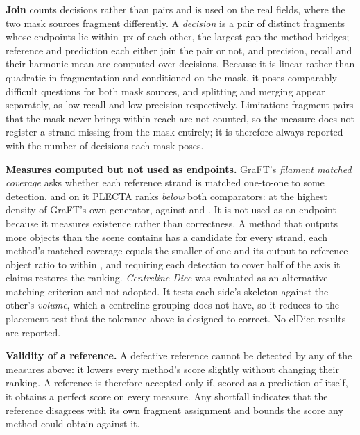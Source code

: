 \textbf{Join \Fone{}} counts decisions rather than pairs and is used on the
real fields, where the two mask sources fragment differently. A
\emph{decision} is a pair of distinct fragments whose endpoints lie within
\PlectaRealJoinReach{}\,px of each other, the largest gap the method bridges;
reference and prediction each either join the pair or not, and precision,
recall and their harmonic mean are computed over decisions. Because it is
linear rather than quadratic in fragmentation and conditioned on the mask, it
poses comparably difficult questions for both mask sources, and splitting and
merging appear separately, as low recall and low precision respectively.
Limitation: fragment pairs that the mask never brings within reach are not
counted, so the measure does not register a strand missing from the mask
entirely; it is therefore always reported with the number of decisions each
mask poses.

\textbf{Measures computed but not used as endpoints.} GraFT's \emph{filament
matched coverage} asks whether each reference strand is matched one-to-one to
some detection, and on it PLECTA ranks \emph{below} both comparators: at the
highest density of GraFT's own generator, \PlectaRegimeHighPlectaMatched{}
against \PlectaRegimeHighGraFTMatched{} and \PlectaRegimeHighDNAiMatched{}. It
is not used as an endpoint because it measures existence rather than
correctness. A method that outputs more objects than the scene contains has a
candidate for every strand, each method's matched coverage equals the smaller
of one and its output-to-reference object ratio to within
\PlectaRegimeCoverageCountResidual{}, and requiring each detection to cover
half of the axis it claims restores the ranking. \emph{Centreline Dice}
\citep{shit2021cldice} was evaluated as an alternative matching criterion and
not adopted. It tests each side's skeleton against the other's \emph{volume},
which a centreline grouping does not have, so it reduces to the placement test
that the tolerance above is designed to correct. No clDice results are
reported.

\textbf{Validity of a reference.} A defective reference cannot be detected by
any of the measures above: it lowers every method's score slightly without
changing their ranking. A reference is therefore accepted only if, scored as a
prediction of itself, it obtains a perfect score on every measure. Any
shortfall indicates that the reference disagrees with its own fragment
assignment and bounds the score any method could obtain against it.

